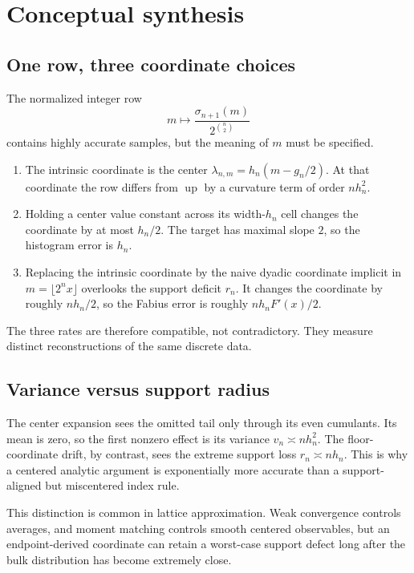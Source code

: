 \documentclass[11pt,oneside]{article}
\theoremstyle{definition}
\theoremstyle{remark}
\newcommand{\Up}{\operatorname{up}}
\begin{document}
\section{Conceptual synthesis}
\label{sec:synthesis}

\subsection{One row, three coordinate choices}

The normalized integer row
\begin{equation}
 m\longmapsto\frac{\sigma_{n+1}(m)}{2^{\binom n2}}        \label{eq:one-row}
\end{equation}
contains highly accurate samples, but the meaning of $m$ must be specified.

\begin{enumerate}
\item The intrinsic coordinate is the center
$\lambda_{n,m}=h_n(m-g_n/2)$.  At that coordinate the row differs from $\Up$ by a curvature
term of order $nh_n^2$.
\item Holding a center value constant across its width-$h_n$ cell changes the coordinate by
at most $h_n/2$.  The target has maximal slope $2$, so the histogram error is $h_n$.
\item Replacing the intrinsic coordinate by the naive dyadic coordinate implicit in
$m=\lfloor2^nx\rfloor$ overlooks the support deficit $r_n$.  It changes the coordinate by
roughly $nh_n/2$, so the Fabius error is roughly $nh_nF'(x)/2$.
\end{enumerate}
The three rates are therefore compatible, not contradictory.  They measure distinct
reconstructions of the same discrete data.

\subsection{Variance versus support radius}

The center expansion sees the omitted tail only through its even cumulants.  Its mean is zero,
so the first nonzero effect is its variance $v_n\asymp nh_n^2$.  The floor-coordinate drift,
by contrast, sees the extreme support loss $r_n\asymp nh_n$.  This is why a centered analytic
argument is exponentially more accurate than a support-aligned but miscentered index rule.

This distinction is common in lattice approximation.  Weak convergence controls averages,
and moment matching controls smooth centered observables, but an endpoint-derived coordinate
can retain a worst-case support defect long after the bulk distribution has become extremely
close.
\end{document}
